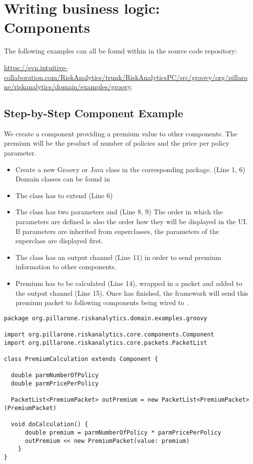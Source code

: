\chapter{Writing business logic: Components}

The following examples can all be found within in the \RA{} source code repository:

\url{https://svn.intuitive-collaboration.com/RiskAnalytics/trunk/RiskAnalyticsPC/src/groovy/org/pillarone/riskanalytics/domain/examples/groovy}.

\section{Step-by-Step Component Example}
\label{sec:comp-eg-steps}

We create a component providing a premium value to other components. The premium will be the product of number of policies and the price per policy parameter.

\begin{itemize}
  \item Create a new Groovy or Java class in the corresponding package. (Line 1, 6) Domain classes can be found in 
  \item The class has to extend  (Line 6)
  \item The class has two parameters  and  (Line 8, 9) The order in which the parameters are defined is also the order how they will be displayed in the UI. If parameters are inherited from superclasses, the parameters of the superclass are displayed first.
  \item The class has an output channel  (Line 11) in order to send premium information to other components.
  \item Premium has to be calculated (Line 14), wrapped in a packet and added to the output channel (Line 15). Once  has finished, the framework will send this premium packet to following components being wired to .
\end{itemize}

\begin{lstlisting}[label=lst:premcalc]
package org.pillarone.riskanalytics.domain.examples.groovy

import org.pillarone.riskanalytics.core.components.Component
import org.pillarone.riskanalytics.core.packets.PacketList

class PremiumCalculation extends Component {

  double parmNumberOfPolicy
  double parmPricePerPolicy

  PacketList<PremiumPacket> outPremium = new PacketList<PremiumPacket>(PremiumPacket)

  void doCalculation() {
      double premium = parmNumberOfPolicy * parmPricePerPolicy
      outPremium << new PremiumPacket(value: premium)
    }
}\end{lstlisting}

